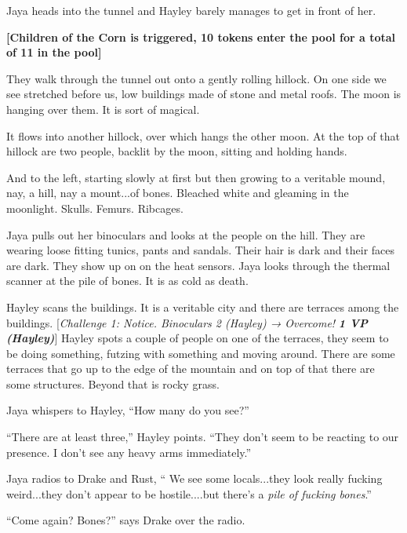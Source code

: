 Jaya heads into the tunnel and Hayley barely manages to get in front of her.  



\textbf{{[}Children of the Corn is triggered, 10 tokens enter the pool for a total of 11 in the pool{]}}



They walk through the tunnel out onto a gently rolling hillock.  On one side we see stretched before us, low buildings made of stone and metal roofs. The moon is hanging over them.  It is sort of magical.  



It flows into another hillock, over which hangs the other moon.  At the top of that hillock are two people, backlit by the moon, sitting and holding hands.  



And to the left, starting slowly at first but then growing to a veritable mound, nay, a hill, nay a mount...of bones.  Bleached white and gleaming in the moonlight.  Skulls.  Femurs.  Ribcages.



Jaya pulls out her binoculars and looks at the people on the hill.  They are wearing loose fitting tunics, pants and sandals.  Their hair is dark and their faces are dark.  They show up on on the heat sensors.  Jaya looks through the thermal scanner at the pile of bones.  It is as cold as death.

Hayley scans the buildings.  It is a veritable city and there are terraces among the buildings.  {[}\textit{Challenge 1: Notice.  Binoculars 2 (Hayley) → Overcome! }\textit{\textbf{1 VP (Hayley)}}{]}  Hayley spots a couple of people on one of the terraces, they seem to be doing something, futzing with something and moving around.  There are some terraces that go up to the edge of the mountain and on top of that there are some structures.  Beyond that is rocky grass.

Jaya whispers to Hayley, ``How many do you see?''

``There are at least three,'' Hayley points.  ``They don't seem to be reacting to our presence.  I don't see any heavy arms immediately.''



Jaya radios to Drake and Rust, `` We see some locals...they look really fucking weird...they don't appear to be hostile....but there's a \textit{pile of fucking bones}.''

``Come again?  Bones?'' says Drake over the radio.

